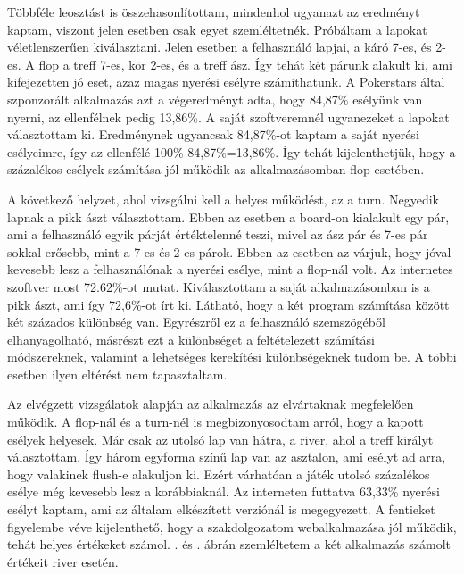 Többféle leosztást is összehasonlítottam, mindenhol ugyanazt az eredményt kaptam, viszont jelen esetben csak egyet szemléltetnék. Próbáltam a lapokat véletlenszerűen kiválasztani. Jelen esetben a felhasználó lapjai, a káró 7-es, és 2-es. A flop a treff 7-es, kör 2-es, és a treff ász. Így tehát két párunk alakult ki, ami kifejezetten jó eset, azaz magas nyerési esélyre számíthatunk. A Pokerstars által szponzorált alkalmazás azt a végeredményt adta, hogy 84,87\% esélyünk van nyerni, az ellenfélnek pedig 13,86\%. A saját szoftveremnél ugyanezeket a lapokat választottam ki. Eredménynek ugyancsak 84,87\%-ot kaptam a saját nyerési esélyeimre, így az ellenfélé 100\%-84,87\%=13,86\%. Így tehát kijelenthetjük, hogy a százalékos esélyek számítása jól működik az alkalmazásomban flop esetében.

A következő helyzet, ahol vizsgálni kell a helyes működést, az a turn. Negyedik lapnak a pikk ászt választottam. Ebben az esetben a board-on kialakult egy pár, ami a felhasználó egyik párját értéktelenné teszi, mivel az ász pár és 7-es pár sokkal erősebb, mint a 7-es és 2-es párok. Ebben az esetben az várjuk, hogy jóval kevesebb lesz a felhasználónak a nyerési esélye, mint a flop-nál volt. Az internetes szoftver most 72.62\%-ot mutat. Kiválasztottam a saját alkalmazásomban is a pikk ászt, ami így 72,6\%-ot írt ki. Látható, hogy a két program számítása között két százados különbség van. Egyrészről ez a felhasználó szemszögéből elhanyagolható, másrészt ezt a különbséget a feltételezett számítási módszereknek, valamint a lehetséges kerekítési különbségeknek tudom be. A többi esetben ilyen eltérést nem tapasztaltam.

Az elvégzett vizsgálatok alapján az alkalmazás az elvártaknak megfelelően működik. A flop-nál és a turn-nél is megbizonyosodtam arról, hogy a kapott esélyek helyesek. Már csak az utolsó lap van hátra, a river, ahol a treff királyt választottam. Így három egyforma színű lap van az asztalon, ami esélyt ad arra, hogy valakinek flush-e alakuljon ki. Ezért várhatóan a játék utolsó százalékos esélye még kevesebb lesz a korábbiaknál. Az interneten futtatva 63,33\% nyerési esélyt kaptam, ami az általam elkészített verziónál is megegyezett. A fentieket figyelembe véve kijelenthető, hogy a szakdolgozatom webalkalmazása jól működik, tehát helyes értékeket számol. . és . ábrán szemléltetem a két alkalmazás számolt értékeit river esetén.

